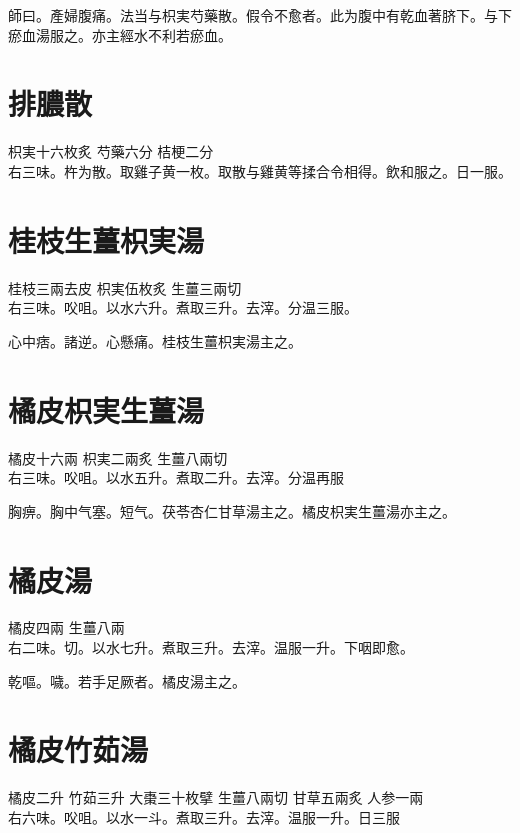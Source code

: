 師曰。產婦腹痛。法当与枳実芍藥散。假令不愈者。此为腹中有乾血著脐下。与下瘀血湯服之。{\khaai 亦}主經水不利若瘀血。

\section{排膿散}

枳実{\scriptsize 十六枚炙} 芍藥{\scriptsize 六分} 桔梗{\scriptsize 二分}\\
右三味。杵为散。取雞子黄一枚。取散与雞黄等揉合令相得。飲和服之。日一服。

\section{桂枝生薑枳実湯}

桂枝{\scriptsize 三兩去皮} 枳実{\scriptsize 伍枚炙} 生薑{\scriptsize 三兩切}\\
右三味。㕮咀。以水六升。煮取三升。去滓。分温三服。

心中痞。諸逆。心懸痛。桂枝生薑枳実湯主之。

\section{橘{\khaai 皮}枳{\khaai 実生}薑湯}

橘皮{\scriptsize 十六兩} 枳実{\scriptsize 二兩炙} 生薑{\scriptsize 八兩切}\\
右三味。㕮咀。以水五升。煮取二升。去滓。分温再服

胸痹。胸中气塞。短气。茯苓杏仁甘草湯主之。橘皮枳実生薑湯亦主之。

\section{橘皮湯}

橘皮{\scriptsize 四兩} 生薑{\scriptsize 八兩}\\
右二味。切。以水七升。煮取三升。去滓。温服一升。下咽即愈。

乾嘔。噦。若手足厥者。橘皮湯主之。

\section{橘皮竹茹湯}

橘皮{\scriptsize 二升} 竹茹{\scriptsize 三升} 大棗{\scriptsize 三十枚擘} 生薑{\scriptsize 八兩切} 甘草{\scriptsize 五兩炙} 人参{\scriptsize 一兩}\\
右六味。㕮咀。以水一斗。煮取三升。去滓。温服一升。日三服

